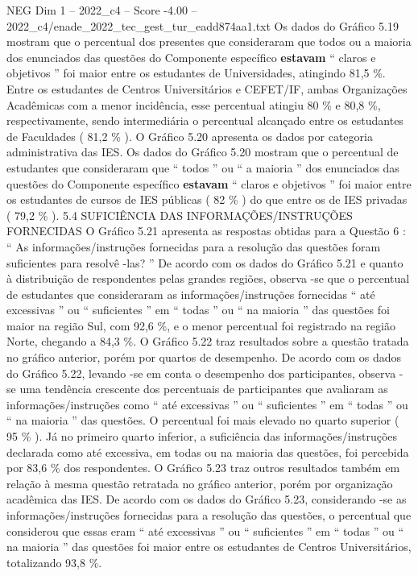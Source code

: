 \begin{textsample}{NEG Dim 1 – 2022\_c4 – Score -4.00 – 2022\_c4/enade\_2022\_tec\_gest\_tur\_eadd874aa1.txt}
Os dados do Gráfico 5.19 mostram que o percentual dos presentes que consideraram que todos ou a maioria dos enunciados das questões do Componente específico \textbf{estavam} “ claros e objetivos ” foi maior entre os estudantes de Universidades, atingindo 81,5 \%.
Entre os estudantes de Centros Universitários e CEFET/IF, ambas Organizações Acadêmicas com a menor incidência, esse percentual atingiu 80 \% e 80,8 \%, respectivamente, sendo intermediária o percentual alcançado entre os estudantes de Faculdades ( 81,2 \% ).
O Gráfico 5.20 apresenta os dados por categoria administrativa das IES.
Os dados do Gráfico 5.20 mostram que o percentual de estudantes que consideraram que “ todos ” ou “ a maioria ” dos enunciados das questões do Componente específico \textbf{estavam} “ claros e objetivos ” foi maior entre os estudantes de cursos de IES públicas ( 82 \% ) do que entre os de IES privadas ( 79,2 \% ). 5.4 SUFICIÊNCIA DAS INFORMAÇÕES/INSTRUÇÕES FORNECIDAS O Gráfico 5.21 apresenta as respostas obtidas para a Questão 6 : “ As informações/instruções fornecidas para a resolução das questões foram suficientes para resolvê -las? ” De acordo com os dados do Gráfico 5.21 e quanto à distribuição de respondentes pelas grandes regiões, observa -se que o percentual de estudantes que consideraram as informações/instruções fornecidas “ até excessivas ” ou “ suficientes ” em “ todas ” ou “ na maioria ” das questões foi maior na região Sul, com 92,6 \%, e o menor percentual foi registrado na região Norte, chegando a 84,3 \%.
O Gráfico 5.22 traz resultados sobre a questão tratada no gráfico anterior, porém por quartos de desempenho.
De acordo com os dados do Gráfico 5.22, levando -se em conta o desempenho dos participantes, observa -se uma tendência crescente dos percentuais de participantes que avaliaram as informações/instruções como “ até excessivas ” ou “ suficientes ” em “ todas ” ou “ na maioria ” das questões.
O percentual foi mais elevado no quarto superior ( 95 \% ).
Já no primeiro quarto inferior, a suficiência das informações/instruções declarada como até excessiva, em todas ou na maioria das questões, foi percebida por 83,6 \% dos respondentes.
O Gráfico 5.23 traz outros resultados também em relação à mesma questão retratada no gráfico anterior, porém por organização acadêmica das IES.
De acordo com os dados do Gráfico 5.23, considerando -se as informações/instruções fornecidas para a resolução das questões, o percentual que considerou que essas eram “ até excessivas ” ou “ suficientes ” em “ todas ” ou “ na maioria ” das questões foi maior entre os estudantes de Centros Universitários, totalizando 93,8 \%.

\end{textsample}
